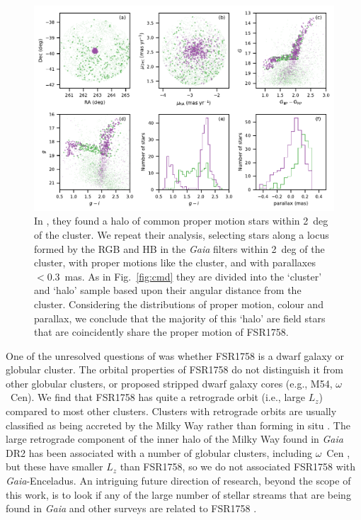 \documentclass[fleqn,usenatbib]{mnras}
\begin{document}
\begin{figure}
	\includegraphics[width=\textwidth]{figures/not_a_halo.pdf}
    \caption{In , they found a halo of common proper motion stars within 2~deg of the cluster. We repeat their analysis, selecting stars along a locus formed by the RGB and HB in the \textit{Gaia} filters within 2~deg of the cluster, with proper motions like the cluster, and with parallaxes $<0.3$~mas. As in Fig.\ \ref{fig:cmd} they are divided into the `cluster' and `halo' sample based upon their angular distance from the cluster. Considering the distributions of proper motion, colour and parallax, we conclude that the majority of this `halo' are field stars that are coincidently share the proper motion of FSR1758.}
    \label{fig:not_a_halo}
\end{figure}

One of the unresolved questions of  was whether FSR1758 is a dwarf galaxy or globular cluster. The orbital properties of FSR1758 do not distinguish it from other globular clusters, or proposed stripped dwarf galaxy cores (e.g., M54, $\omega$~Cen). We find that FSR1758 has quite a retrograde orbit (i.e., large $L_z$) compared to most other clusters. Clusters with retrograde orbits are usually classified as being accreted by the Milky Way rather than forming in situ \citep[e.g.,][]{Kruijssen2018}. The large retrograde component of the inner halo of the Milky Way found in \textit{Gaia} DR2 has been associated with a number of globular clusters, including $\omega$~Cen \citep{Helmi:2018wy}, but these have smaller $L_z$ than FSR1758, so we do not associated FSR1758 with \textit{Gaia}-Enceladus. An intriguing future direction of research, beyond the scope of this work, is to look if any of the large number of stellar streams that are being found in \textit{Gaia} and other surveys are related to FSR1758 \citep[e.g.,][]{Shipp2018,Ibata:2018wn,Malhan:2018ko,Ibata2019}.
\end{document}
